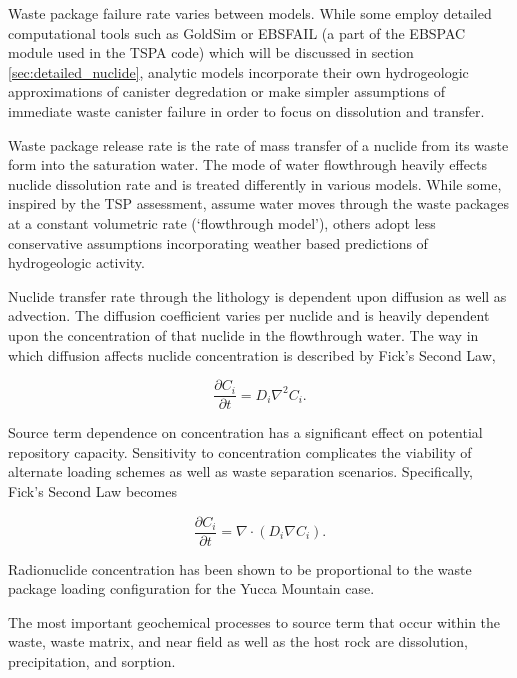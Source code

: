 Waste package failure rate varies between models. While some employ detailed 
computational tools such as GoldSim or EBSFAIL (a part of the EBSPAC module 
used in the TSPA code) which will be discussed in section 
\ref{sec:detailed_nuclide}, 
analytic models incorporate their own hydrogeologic approximations of
canister degredation or make simpler assumptions of immediate waste canister 
failure in order to focus on dissolution and transfer. 

Waste package release rate is the rate of mass transfer of a nuclide from its
waste form into the saturation water. The mode of water flowthrough heavily
effects nuclide dissolution rate and is treated differently in various models.
While some, inspired by the TSP assessment, assume water moves through the
waste packages at a constant volumetric rate (`flowthrough model'), others
adopt less conservative assumptions incorporating weather based predictions of
hydrogeologic activity.

Nuclide transfer rate through the lithology is  dependent upon diffusion as
well as advection.  The diffusion coefficient varies per nuclide and is heavily
dependent upon the concentration of that nuclide in the flowthrough water.
The way in which diffusion affects nuclide concentration is described by Fick's 
Second Law, 

\begin{equation} 
  \frac{\partial C_i}{\partial t}  = D_i\nabla^2 C_i.  
\end{equation}

Source term dependence on concentration has a significant effect on potential
repository capacity. Sensitivity to concentration complicates the viability of
alternate loading schemes as well as waste separation scenarios. Specifically, 
Fick's Second Law becomes 

\begin{equation} 
  \frac{\partial C_i}{\partial t}  = \nabla \cdot ( D_i \nabla C_i ). 
\end{equation}

Radionuclide concentration has been shown to be proportional to the waste package
loading configuration for the Yucca Mountain case. 
\cite{ahn_relationship_2002,kawasaki_congruent_2004}

The most important geochemical processes to source term that occur within the
waste, waste matrix, and near field as well as the host rock are dissolution,
precipitation, and sorption.  \cite{bracke_safety_2008}

